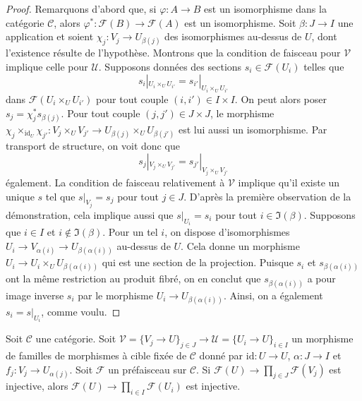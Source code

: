 \begin{proof}
Remarquons d’abord que, si $\varphi : A \to B$ est un isomorphisme dans la
catégorie $\mathcal{C}$, alors
$\varphi^* : \mathcal{F}(B) \to \mathcal{F}(A)$ est un isomorphisme. Soit
$\beta : J \to I$ une application et soient
$\chi_j : V_j \to U_{\beta(j)}$ des isomorphismes au-dessus de $U$, dont
l’existence résulte de l’hypothèse. Montrons que la condition de faisceau pour
$\mathcal{V}$ implique celle pour $\mathcal{U}$. Supposons données des
sections $s_i \in \mathcal{F}(U_i)$ telles que
$$
s_i|_{U_i \times_U U_{i'}} = s_{i'}|_{U_i \times_U U_{i'}}
$$
dans $\mathcal{F}(U_i \times_U U_{i'})$ pour tout couple
$(i, i') \in I \times I$. On peut alors poser
$s_j = \chi_j^*s_{\beta(j)}$. Pour tout couple
$(j, j') \in J \times J$, le morphisme
$\chi_j \times_{\text{id}_U} \chi_{j'} : V_j \times_U V_{j'} \to
U_{\beta(j)} \times_U U_{\beta(j')}$ est lui aussi un isomorphisme. Par
transport de structure, on voit donc que
$$
s_j|_{V_j \times_U V_{j'}} = s_{j'}|_{V_j \times_U V_{j'}}
$$
également. La condition de faisceau relativement à $\mathcal{V}$ implique
qu’il existe un unique $s$ tel que $s|_{V_j} = s_j$ pour tout $j \in J$.
D’après la première observation de la démonstration, cela implique aussi que
$s|_{U_i} = s_i$ pour tout $i \in \Im(\beta)$. Supposons que $i \in I$ et
$i \not \in \Im(\beta)$. Pour un tel $i$, on dispose d’isomorphismes
$U_i \to V_{\alpha(i)} \to U_{\beta(\alpha(i))}$ au-dessus de $U$. Cela donne
un morphisme $U_i \to U_i \times_U U_{\beta(\alpha(i))}$ qui est une section
de la projection. Puisque $s_i$ et $s_{\beta(\alpha(i))}$ ont la même
restriction au produit fibré, on en conclut que
$s_{\beta(\alpha(i))}$ a pour image inverse $s_i$ par le morphisme
$U_i \to U_{\beta(\alpha(i))}$. Ainsi,
on a également $s_i = s|_{U_i}$, comme voulu.
\end{proof}

\begin{lemma}
\label{lemma-compare-separated-presheaf-condition}
Soit $\mathcal{C}$ une catégorie. Soit
$\mathcal{V} = \{V_j \to U\}_{j \in J} \to
\mathcal{U} = \{U_i \to U\}_{i \in I}$ un morphisme de familles de
morphismes à cible fixée de $\mathcal{C}$ donné par
$\text{id} : U \to U$, $\alpha : J \to I$ et
$f_j : V_j \to U_{\alpha(j)}$. Soit $\mathcal{F}$ un préfaisceau sur
$\mathcal{C}$. Si
$\mathcal{F}(U) \to \prod_{j \in J} \mathcal{F}(V_j)$ est injective, alors
$\mathcal{F}(U) \to \prod_{i \in I} \mathcal{F}(U_i)$ est injective.
\end{lemma}

